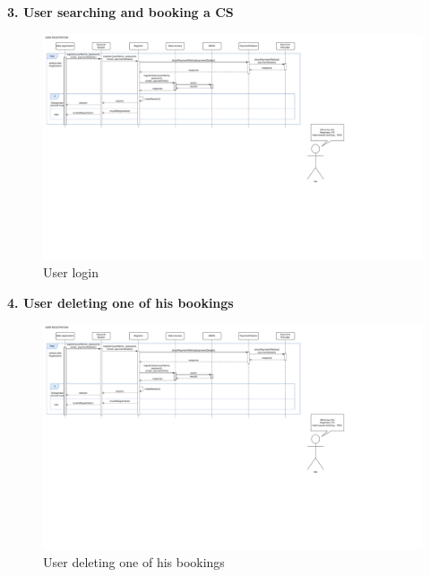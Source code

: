 \documentclass[11pt]{article}
\begin{document}
\begin{description}
    \item \textbf{3. User searching and booking a CS}
    \begin{figure}[!ht]
        \centering
        \includegraphics[page={3}, trim=0cm 5cm 0cm 1cmm, width=\linewidth, clip]{RuntimeDiagrams.pdf}
        \caption{User login}
    \end{figure}
    
    \item \textbf{4. User deleting one of his bookings}
    \begin{figure}[!ht]
        \centering
        \includegraphics[page={4}, trim=0cm 10cm 21cm 1cmm, width=0.95\linewidth, clip]{RuntimeDiagrams.pdf}
        \caption{User deleting one of his bookings}
    \end{figure}
    
    \newpage
    

\end{description}
\end{document}

